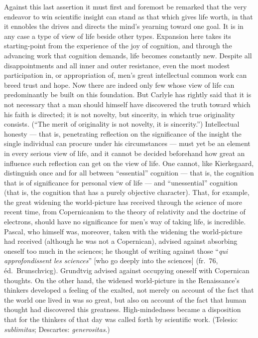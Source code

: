 \documentclass[12pt]{book}
\newcommand{\opage}[1]{\marginnote{\footnotesize\textit{[#1]}}}
\begin{document}
Against this last assertion it must first and foremost be remarked that the very endeavor to win scientific insight
can stand as that which gives life worth, in that it ennobles the drives and directs the mind's yearning toward one
goal. It is in any case a type of view of life beside other types. Expansion here takes its starting-point from the
experience of the joy of cognition, and through the advancing work that cognition demands, life becomes constantly
new. Despite all disappointments and all inner and outer resistance, even the most modest participation in, or
appropriation of, men's great intellectual common work can breed trust and hope. Now there are indeed only few whose
view of life can predominantly be built on this foundation. But Carlyle has rightly said that it is not necessary
that a man should himself have discovered the truth toward which his faith is directed; it is not novelty, but
sincerity, in which true originality consists. (``The merit of originality is not novelty, it is sincerity.'')
Intellectual honesty --- that is, penetrating reflection on the significance of the insight the single individual
can procure under his circumstances --- must yet be an element in every serious view of life, and it \opage{73}cannot be
decided beforehand how great an influence such reflection can get on the view of life. One cannot, like Kierkegaard,
distinguish once and for all between ``essential'' cognition --- that is, the cognition that is of significance for
personal view of life --- and ``unessential'' cognition (that is, the cognition that has a purely objective
character). That, for example, the great widening the world-picture has received through the science of more recent
time, from Copernicanism to the theory of relativity and the doctrine of electrons, should have no significance for
men's way of taking life, is incredible. Pascal, who himself was, moreover, taken with the widening the world-picture
had received (although he was not a Copernican), advised against absorbing oneself too much in the sciences; he
thought of writing against those ``\textit{qui approfondissent les sciences}'' [who go deeply into the sciences]
(fr.\ 76, éd.\ Brunschvicg). Grundtvig advised against occupying oneself with Copernican thoughts. On the other
hand, the widened world-picture in the Renaissance's thinkers developed a feeling of the exalted, not merely on
account of the fact that the world one lived in was so great, but also on account of the fact that human thought had
discovered this greatness. High-mindedness became a disposition that for the thinkers of that day was called forth by
scientific work. (Telesio: \textit{sublimitas}; Descartes: \textit{generositas}.)
\end{document}
